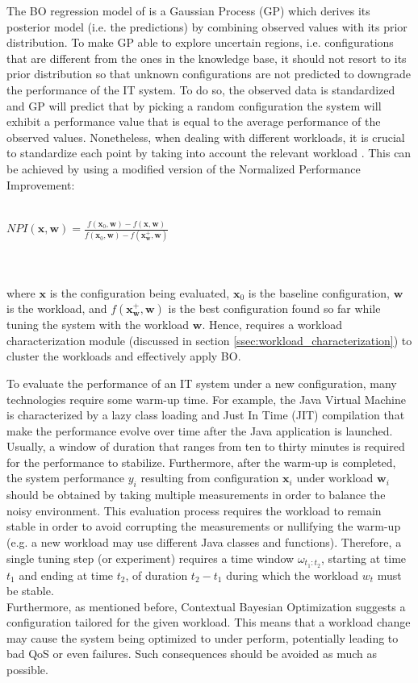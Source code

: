 \documentclass[a4paper, 12pt]{article} %
\begin{document}
	The BO regression model of \cite{AkamasCGP} is a Gaussian Process (GP) which derives its posterior model (i.e. the predictions) by combining observed values with its prior distribution. To make GP able to explore uncertain regions, i.e. configurations that are different from the ones in the knowledge base, it should not resort to its prior distribution \cite{AkamasCGP} so that unknown configurations are not predicted to downgrade the performance of the IT system. To do so, the observed data is standardized and GP will predict that by picking a random configuration the system will exhibit a performance value that is equal to the average performance of the observed values. Nonetheless, when dealing with different workloads, it is crucial to standardize each point by taking into account the relevant workload \cite{AkamasCGP}. This can be achieved by using a modified version of the Normalized Performance Improvement:\\\\
	\centerline{
	$
	NPI(\pmb{x}, \pmb{w}) = \frac{f(\pmb{x}_0, \pmb{w}) - f(\pmb{x}, \pmb{w})}{f(\pmb{x}_0, \pmb{w}) - f(\pmb{x}^+_{\pmb{w}}, \pmb{w})}
	$
	}\\\\
	where $\pmb{x}$ is the configuration being evaluated, $\pmb{x}_0$ is the baseline configuration, $\pmb{w}$ is the workload, and $f(\pmb{x}^+_{\pmb{w}}, \pmb{w})$ is the best configuration found so far while tuning the system with the workload $\pmb{w}$. Hence, \cite{AkamasCGP} requires a workload characterization module (discussed in section \ref{ssec:workload_characterization}) to cluster the workloads and effectively apply BO.
	
	To evaluate the performance of an IT system under a new configuration, many technologies require some warm-up time. For example, the Java Virtual Machine is characterized by a lazy class loading and Just In Time (JIT) compilation that make the performance evolve over time after the Java application is launched. Usually, a window of duration that ranges from ten to thirty minutes is required for the performance to stabilize. Furthermore, after the warm-up is completed, the system performance $y_i$ resulting from configuration $\pmb{x}_i$ under workload $\pmb{w}_i$ should be obtained by taking multiple measurements in order to balance the noisy environment. This evaluation process requires the workload to remain stable in order to avoid corrupting the measurements or nullifying the warm-up (e.g. a new workload may use different Java classes and functions). Therefore, a single tuning step (or experiment) requires a time window $\omega_{t_1:t_2}$, starting at time $t_1$ and ending at time $t_2$, of duration $t_2 - t_1$ during which the workload $w_t$ must be stable.\\
	Furthermore, as mentioned before, Contextual Bayesian Optimization suggests a configuration tailored for the given workload.  This means that a workload change may cause the system being optimized to under perform, potentially leading to bad QoS or even failures. Such consequences should be avoided as much as possible.
	
\end{document}
